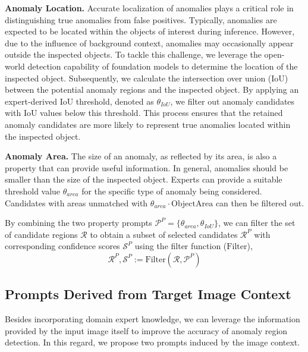 \documentclass{article}
\begin{document}
\noindent\textbf{Anomaly Location.} Accurate localization of anomalies plays a critical role in distinguishing true anomalies from false positives. Typically, anomalies are expected to be located within the objects of interest during inference. However, due to the influence of background context, anomalies may occasionally appear outside the inspected objects. To tackle this challenge, we leverage the open-world detection capability of foundation models to determine the location of the inspected object. Subsequently, we calculate the intersection over union (IoU) between the potential anomaly regions and the inspected object. By applying an expert-derived IoU threshold, denoted as $\theta_{IoU}$, we filter out anomaly candidates with IoU values below this threshold. This process ensures that the retained anomaly candidates are more likely to represent true anomalies located within the inspected object.

\noindent\textbf{Anomaly Area.} The size of an anomaly, as reflected by its area, is also a property that can provide useful information. In general, anomalies should be smaller than the size of the inspected object. Experts can provide a suitable threshold value $\theta_{area}$ for the specific type of anomaly being considered. Candidates with areas unmatched with $\theta_{area} \cdot \mathrm{Object Area}$ can then be filtered out.

By combining the two property prompts $\mathcal{P}^P=\{ \theta_{area}, \theta_{IoU} \}$, we can filter the set of candidate regions $\mathcal{R}$ to obtain a subset of selected candidates $\mathcal{R}^P$ with corresponding confidence scores $\mathcal{S}^P$ using the filter function ($\mathrm{Filter}$),
\begin{equation}
    \mathcal{R}^P, \mathcal{S}^P := \mathrm{Filter}(\mathcal{R}, \mathcal{P}^P)
\end{equation}


\subsection{Prompts Derived from Target Image Context}

Besides incorporating domain expert knowledge, we can leverage the information provided by the input image itself to improve the accuracy of anomaly region detection. In this regard, we propose two prompts induced by the image context.
\end{document}
